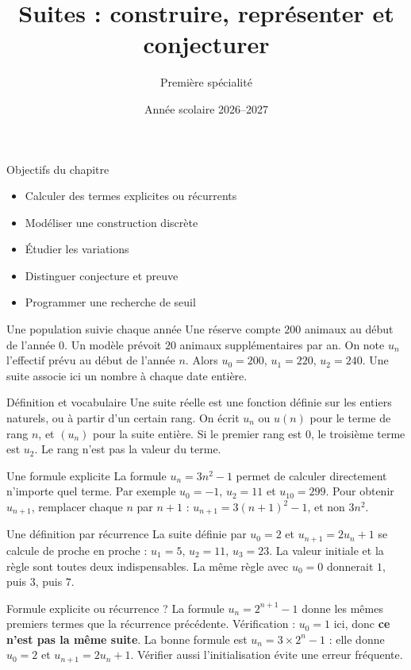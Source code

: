 \documentclass[aspectratio=169,12pt]{beamer}
\title{Suites : construire, représenter et conjecturer}
\subtitle{Première spécialité}
\date{Année scolaire 2026--2027}
\begin{document}
\begin{frame}\titlepage\end{frame}
\begin{frame}{Objectifs du chapitre}\begin{itemize}
\item Calculer des termes explicites ou récurrents
\item Modéliser une construction discrète
\item Étudier les variations
\item Distinguer conjecture et preuve
\item Programmer une recherche de seuil
\end{itemize}\end{frame}
\renewcommand{\slidekind}{COMPRENDRE}
\begin{frame}[t,fragile]{Une population suivie chaque année}
Une réserve compte $200$ animaux au début de l’année $0$. Un modèle prévoit $20$ animaux supplémentaires par an. On note $u_n$ l’effectif prévu au début de l’année $n$. Alors $u_0=200$, $u_1=220$, $u_2=240$. Une suite associe ici un nombre à chaque date entière.
\end{frame}
\renewcommand{\slidekind}{COMPRENDRE}
\begin{frame}[t,fragile]{Définition et vocabulaire}
Une suite réelle est une fonction définie sur les entiers naturels, ou à partir d’un certain rang. On écrit $u_n$ ou $u(n)$ pour le terme de rang $n$, et $(u_n)$ pour la suite entière. Si le premier rang est $0$, le troisième terme est $u_2$. Le rang n’est pas la valeur du terme.
\end{frame}
\renewcommand{\slidekind}{COMPRENDRE}
\begin{frame}[t,fragile]{Une formule explicite}
La formule $u_n=3n^2-1$ permet de calculer directement n’importe quel terme. Par exemple $u_0=-1$, $u_2=11$ et $u_{10}=299$. Pour obtenir $u_{n+1}$, remplacer chaque $n$ par $n+1$ : $u_{n+1}=3(n+1)^2-1$, et non $3n^2$.
\end{frame}
\renewcommand{\slidekind}{COMPRENDRE}
\begin{frame}[t,fragile]{Une définition par récurrence}
La suite définie par $u_0=2$ et $u_{n+1}=2u_n+1$ se calcule de proche en proche : $u_1=5$, $u_2=11$, $u_3=23$. La valeur initiale et la règle sont toutes deux indispensables. La même règle avec $u_0=0$ donnerait $1$, puis $3$, puis $7$.
\end{frame}
\renewcommand{\slidekind}{COMPRENDRE}
\begin{frame}[t,fragile]{Formule explicite ou récurrence ?}
La formule $u_n=2^{n+1}-1$ donne les mêmes premiers termes que la récurrence précédente. Vérification : $u_0=1$ ici, donc \textbf{ce n’est pas la même suite}. La bonne formule est $u_n=3\times2^n-1$ : elle donne $u_0=2$ et $u_{n+1}=2u_n+1$. Vérifier aussi l’initialisation évite une erreur fréquente.
\end{frame}
\end{document}
